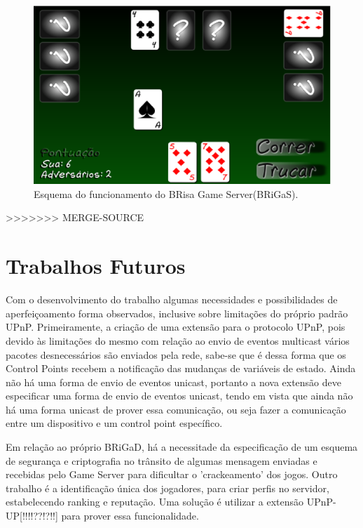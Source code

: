 \documentclass[a4paper]{sbgames}               %
\begin{document}
\begin{figure}[h!]
    \centering
    \includegraphics[scale=0.35]{images/screen-in_game-n800.eps}
    \caption{Esquema do funcionamento do BRisa Game Server(BRiGaS).}
    \label{fig:avschema_new}
\vspace{-5mm}
\end{figure}
\vspace{3mm}
\normalsize

>>>>>>> MERGE-SOURCE
\section{Trabalhos Futuros}
Com o desenvolvimento do trabalho algumas necessidades e possibilidades de aperfeiçoamento forma observados, inclusive sobre limitações do próprio padrão UPnP. Primeiramente, a criação de uma extensão para o protocolo UPnP, pois devido às limitações do mesmo com relação ao envio de eventos multicast vários pacotes desnecessários são enviados pela rede, sabe-se que é dessa forma que os Control Points recebem a notificação das mudanças de variáveis de estado. Ainda não há uma forma de envio de eventos unicast, portanto a nova extensão deve especificar uma forma de envio de eventos unicast, tendo em vista que ainda não há uma forma unicast de prover essa comunicação, ou seja fazer a comunicação entre um dispositivo e um control point específico.

Em relação ao próprio BRiGaD, há a necessitade da especificação de um esquema de segurança e criptografia no trânsito de algumas mensagem enviadas e recebidas pelo Game Server para dificultar o 'crackeamento' dos jogos. Outro trabalho é a identificação única dos jogadores, para criar perfis no servidor, estabelecendo ranking e reputação. Uma solução é utilizar a extensão UPnP-UP[!!!!??!?!!] para prover essa funcionalidade.
\end{document}
